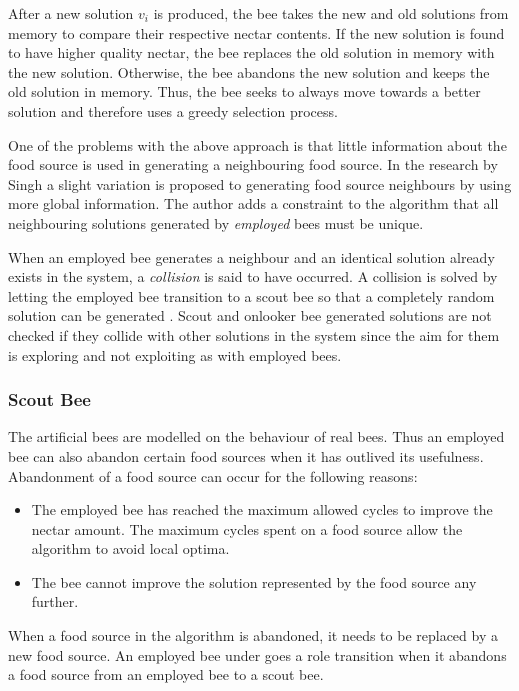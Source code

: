 After a new solution $v_i$ is produced, the bee takes the new and old solutions from memory to compare their respective nectar contents. If the new solution is found to have higher quality nectar, the bee replaces the old solution in memory with the new solution\cite{ABCCompareStudy,BeeJobShop,ABCImageEnhancement,ABCReconfigDistro}. Otherwise, the bee abandons the new solution and keeps the old solution in memory\cite{ABCCompareStudy,ABCLeafConstrained,ABCNumericalOptimization}. Thus, the bee seeks to always move towards a better solution and therefore uses a greedy selection process\cite{ABCCompareStudy,ABCLeafConstrained,ABCReconfigDistro}.

One of the problems with the above approach is that little information about the food source is used in generating a neighbouring food source. In the research by Singh \cite{ABCLeafConstrained} a slight variation is proposed to generating food source neighbours by using more global information. The author adds a constraint to the algorithm that all neighbouring solutions generated by \emph{employed} bees must be unique. 

When an employed bee generates a neighbour and an identical solution already exists in the system, a \emph{collision} is said to have occurred. A collision is solved by letting the employed bee transition to a scout bee so that a completely random solution can be generated \cite{ABCLeafConstrained}. Scout and onlooker bee generated solutions are not checked if they collide with other solutions in the system since the aim for them is exploring and not exploiting as with employed bees\cite{BeeJobShop,ABCCompareStudy}. 
\subsubsection{Scout Bee}
The artificial bees are modelled on the behaviour of real bees. Thus an employed bee can also abandon certain food sources when it has outlived its usefulness. Abandonment of a food source can occur for the following reasons\cite{BeeJobShop,ABCNumericalOptimization,ABCImageEnhancement}:
\begin{itemize}
\item The employed bee has reached the maximum allowed cycles to improve the nectar amount. The maximum cycles spent on a food source allow the algorithm to avoid local optima\cite{ABCCompareStudy,ABCNumericalOptimization,ABCImageEnhancement}.
\item The bee cannot improve the solution represented by the food source any further\cite{ABCCompareStudy,ABCNumericalOptimization,ABCImageEnhancement}.
\end{itemize}
When a food source in the algorithm is abandoned, it needs to be replaced by a new food source\cite{BeeJobShop,ABCCompareStudy,ABCImageEnhancement}. An employed bee under goes a role transition when it abandons a food source from an employed bee to a scout bee\cite{ABCCompareStudy,ABCNumericalOptimization,ABCImageEnhancement}. 

